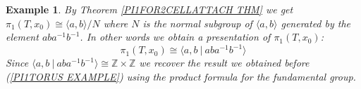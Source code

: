 \documentclass[11pt, letterpaper, oneside]{report}
\theoremstyle{pplain}
\theoremstyle{ddefinition}
\newtheorem{example}[theorem]{Example}
\theoremstyle{nnn}
\theoremstyle{eexercise}
\newcommand{\Z}{{\mathbb Z}}
\begin{document}
\begin{example}
 
 
 By Theorem  \ref{PI1FOR2CELLATTACH THM} we get  
 $\pi_{1}(T, x_{0}) \cong \langle a, b \rangle/N$ where $N$ is the normal subgroup 
 of $\langle a, b\rangle$ generated by the element $aba^{-1}b^{-1}$. In other words 
 we obtain a presentation of $\pi_{1}(T, x_{0})$:
 $$\pi_{1}(T, x_{0}) \cong \langle a, b \ | \  aba^{-1}b^{-1} \rangle $$ 
 Since $\langle a, b \ | \  aba^{-1}b^{-1} \rangle  \cong \Z\times \Z$ we recover the result 
we obtained before  (\ref{PI1TORUS EXAMPLE}) using the product formula for the fundamental group.


\end{example}
\end{document}
